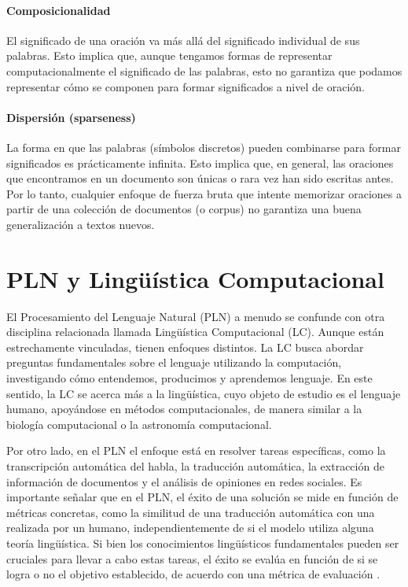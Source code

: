 \paragraph{Composicionalidad}
El significado de una oración va más allá del significado individual de sus palabras. Esto implica que, aunque tengamos formas de representar computacionalmente el significado de las palabras, esto no garantiza que podamos representar cómo se componen para formar significados a nivel de oración.

\paragraph{Dispersión (sparseness)}

La forma en que las palabras (símbolos discretos) pueden combinarse para formar significados es prácticamente infinita. Esto implica que, en general, las oraciones que encontramos en un documento son únicas o rara vez han sido escritas antes. Por lo tanto, cualquier enfoque de fuerza bruta que intente memorizar oraciones a partir de una colección de documentos (o corpus) no garantiza una buena generalización a textos nuevos.






\section{PLN y Lingüística Computacional}

El Procesamiento del Lenguaje Natural (PLN) a menudo se confunde con otra disciplina relacionada llamada Lingüística Computacional (LC). Aunque están estrechamente vinculadas, tienen enfoques distintos. La LC busca abordar preguntas fundamentales sobre el lenguaje utilizando la computación, investigando cómo entendemos, producimos y aprendemos lenguaje. En este sentido, la LC se acerca más a la lingüística, cuyo objeto de estudio es el lenguaje humano, apoyándose en métodos computacionales, de manera similar a la biología computacional o la astronomía computacional.

Por otro lado, en el PLN el enfoque está en resolver tareas específicas, como la transcripción automática del habla, la traducción automática, la extracción de información de documentos y el análisis de opiniones en redes sociales. Es importante señalar que en el PLN, el éxito de una solución se mide en función de métricas concretas, como la similitud de una traducción automática con una realizada por un humano, independientemente de si el modelo utiliza alguna teoría lingüística. Si bien los conocimientos lingüísticos fundamentales pueden ser cruciales para llevar a cabo estas tareas, el éxito se evalúa en función de si se logra o no el objetivo establecido, de acuerdo con una métrica de evaluación \cite{jacobbook}.

